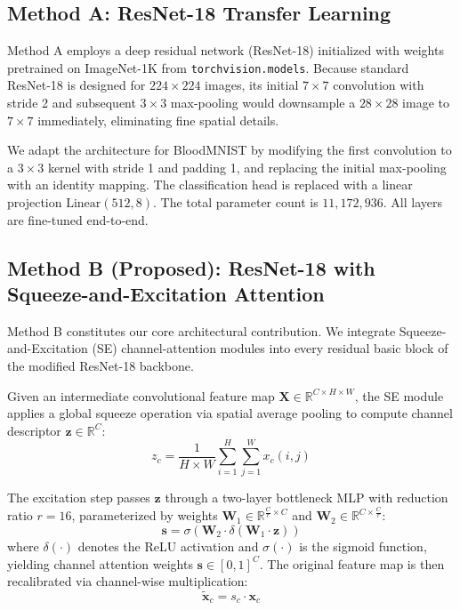 \documentclass[conference]{IEEEtran}
\begin{document}
\subsection{Method A: ResNet-18 Transfer Learning}
Method A employs a deep residual network (ResNet-18) \cite{he2016deep} initialized with weights pretrained on ImageNet-1K from \texttt{torchvision.models}. Because standard ResNet-18 is designed for $224 \times 224$ images, its initial $7 \times 7$ convolution with stride 2 and subsequent $3 \times 3$ max-pooling would downsample a $28 \times 28$ image to $7 \times 7$ immediately, eliminating fine spatial details. 

We adapt the architecture for BloodMNIST by modifying the first convolution to a $3 \times 3$ kernel with stride 1 and padding 1, and replacing the initial max-pooling with an identity mapping. The classification head is replaced with a linear projection $\text{Linear}(512, 8)$. The total parameter count is $11,172,936$. All layers are fine-tuned end-to-end.

\subsection{Method B (Proposed): ResNet-18 with Squeeze-and-Excitation Attention}
Method B constitutes our core architectural contribution. We integrate Squeeze-and-Excitation (SE) channel-attention modules \cite{hu2018squeeze} into every residual basic block of the modified ResNet-18 backbone.

Given an intermediate convolutional feature map $\mathbf{X} \in \mathbb{R}^{C \times H \times W}$, the SE module applies a global squeeze operation via spatial average pooling to compute channel descriptor $\mathbf{z} \in \mathbb{R}^C$:
\begin{equation}
z_c = \frac{1}{H \times W} \sum_{i=1}^{H} \sum_{j=1}^{W} x_c(i, j)
\end{equation}

The excitation step passes $\mathbf{z}$ through a two-layer bottleneck MLP with reduction ratio $r = 16$, parameterized by weights $\mathbf{W}_1 \in \mathbb{R}^{\frac{C}{r} \times C}$ and $\mathbf{W}_2 \in \mathbb{R}^{C \times \frac{C}{r}}$:
\begin{equation}
\mathbf{s} = \sigma(\mathbf{W}_2 \cdot \delta(\mathbf{W}_1 \cdot \mathbf{z}))
\end{equation}
where $\delta(\cdot)$ denotes the ReLU activation and $\sigma(\cdot)$ is the sigmoid function, yielding channel attention weights $\mathbf{s} \in [0, 1]^C$. The original feature map is then recalibrated via channel-wise multiplication:
\begin{equation}
\widetilde{\mathbf{x}}_c = s_c \cdot \mathbf{x}_c
\end{equation}
\end{document}
